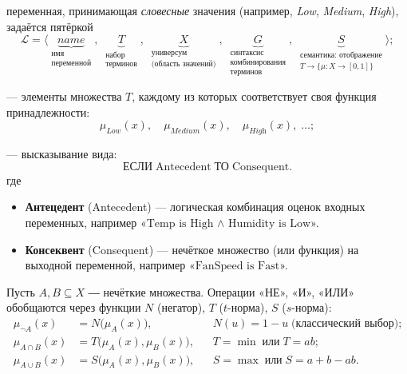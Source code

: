 \begin{description}[leftmargin=0pt]
  \item[Лингвистическая переменная] 
    переменная, принимающая \emph{словесные} значения (например, 
    \textit{Low}, \textit{Medium}, \textit{High}), задаётся пятёркой
    \[
      \mathcal{L} = \bigl\langle
        \underbrace{\textit{name}}_{\substack{\text{имя}\\\text{переменной}}},
        \;
        \underbrace{T}_{\substack{\text{набор}\\\text{терминов}}},
        \;
        \underbrace{X}_{\substack{\text{универсум}\\\text{(область значений)}}},
        \;
        \underbrace{G}_{\substack{\text{синтаксис}\\\text{комбинирования}\\\text{терминов}}},
        \;
        \underbrace{S}_{\substack{\text{семантика: отображение}\\T\to\{\mu\colon X\to[0,1]\}}}
      \bigr\rangle;
    \]
  \item[Термы]
    — элементы множества \(T\), каждому из которых соответствует своя функция
    принадлежности:
    \[
      \mu_{\textit{Low}}(x),\quad
      \mu_{\textit{Medium}}(x),\quad
      \mu_{\textit{High}}(x), \;\dots;
    \]
  \item[Нечёткое правило]
    — высказывание вида:
    \[
      \textbf{ЕСЛИ}\;\text{Antecedent}\;\textbf{ТО}\;\text{Consequent}.
    \]
    где
    \begin{itemize}[nosep]
      \item \textbf{Антецедент} (Antecedent) — логическая комбинация
            оценок входных переменных, например
            «\(\text{Temp is High}\) \(\land\) \(\text{Humidity is Low}\)».
      \item \textbf{Консеквент} (Consequent) — нечёткое множество (или
            функция) на выходной переменной, например
            «\(\text{FanSpeed is Fast}\)».
    \end{itemize}
\end{description}
\bigskip
Пусть $A,B\subseteq X$ ― нечёткие множества.
Операции «НЕ», «И», «ИЛИ» обобщаются через функции
$N$ (негатор), $T$ ($t$-норма), $S$ ($s$-норма):
\begingroup
  \setlength{\jot}{0.3em}
  \begin{align*}
    \mu_{\neg A}(x) &= N\!\bigl(\mu_A(x)\bigr),
      && N(u)=1-u \;\text{(классический выбор);}   \\[0.5em]
    \mu_{A\cap B}(x) &= T\!\bigl(\mu_A(x),\mu_B(x)\bigr),
      && T=\min\;\text{или}\;T=ab;                 \\[0.5em]
    \mu_{A\cup B}(x) &= S\!\bigl(\mu_A(x),\mu_B(x)\bigr),
      && S=\max\;\text{или}\;S=a+b-ab.
  \end{align*}
\endgroup

